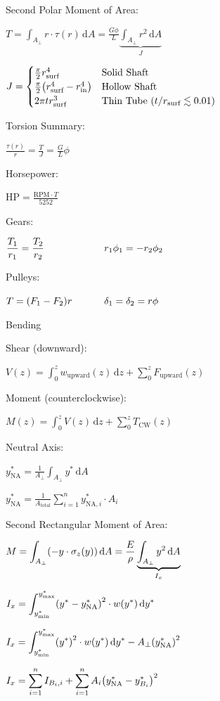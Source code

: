 \documentclass[10pt]{article}
\makeatletter
\newcommand{\ds}{\displaystyle}
\newcommand{\tab}{\hspace{.02\textwidth}}
\newcommand{\twoEqn}[4]{$\makebox[#3][l]{$#1$} \makebox[#4][l]{$#2$}$}
\renewcommand{\d}{\,\mathrm{d}}
\newcommand{\lrb}[1]{\left(#1\right)}
\let\originalleft\left
\let\originalright\right
\renewcommand{\left}{\mathopen{}\mathclose\bgroup\originalleft}
\renewcommand{\right}{\aftergroup\egroup\originalright}
\renewcommand{\section}{\@startsection{section}{1}{0ex}
                                {-2ex}
                                {0.7ex}
                                {\normalfont\large\bfseries}}
\newcommand{\surf}{\text{surf}}
\newcommand{\upward}{\text{upward}}
\newcommand{\CW}{\text{CW}}
\newcommand{\NA}{\text{NA}}
\renewcommand{\max}{\text{max}}
\renewcommand{\min}{\text{min}}
\newcommand{\total}{\text{total}}
\makeatother
\begin{document}
\begin{multicols*}{3}
Second Polar Moment of Area:

\tab $\ds T=\int_{A_\perp}r\cdot\tau(r)\d A=\frac{G\phi}{L}\underbrace{\int_{A_\perp}r^2\d A}_{J}$

\tab $\ds J=\begin{cases}
    \frac{\pi}{2}r_\surf^4 & \text{Solid Shaft} \\
    \frac{\pi}{2}\lrb{r_\surf^4-r_{\text{in}}^4} & \text{Hollow Shaft} \\
    2\pi tr_\surf^3 & \text{Thin Tube } (t/r_\surf\lesssim 0.01)
\end{cases}$

Torsion Summary:

\tab $\ds\frac{\tau(r)}{r}=\frac TJ=\frac GL\phi$

Horsepower:

\tab $\ds \mathrm{HP}=\frac{\mathrm{RPM}\cdot T}{5252}$

Gears:

\tab\twoEqn{\ds\frac{T_1}{r_1}=\frac{T_2}{r_2}}{r_1\phi_1=-r_2\phi_2}{10em}{10em}

Pulleys:

\tab\twoEqn{T=\lrb{F_1-F_2}r}{\delta_1=\delta_2=r\phi}{10em}{10em}

\newcolumn
\section{Bending}

Shear (downward):

\tab $\ds V(z)=\int_0^z w_\upward(z)\d z+\sum_0^z F_\upward(z)$

Moment (counterclockwise):

\tab $\ds M(z)=\int_0^z V(z)\d z+\sum_0^z T_\CW(z)$

Neutral Axis:

\tab $\ds y_\NA^*=\frac{1}{A_\perp}\int_{A_\perp}y^*\d A$

\tab $\ds y_\NA^*=\frac{1}{A_\total}\sum_{i=1}^n y_{\text{NA},i}^*\cdot A_i$

Second Rectangular Moment of Area:

\tab $\ds M=\int_{A_\perp}\lrb{-y\cdot\sigma_z(y)}\d A=\frac E\rho\underbrace{\int_{A_\perp}y^2\d A}_{I_x}$

\tab $\ds I_x=\int_{y_\min^*}^{y_\max^*}\lrb{y^*-y_\NA^*}^2\cdot w(y^*)\d y^*$

\tab $\ds I_x=\int_{y_\min^*}^{y_\max^*}\lrb{y^*}^2\cdot w(y^*)\d y^*-A_{\perp}\lrb{y_\NA^*}^2$

\tab $\ds I_x=\sum_{i=1}^n I_{B_i,i}+\sum_{i=1}^n A_i\lrb{y_\NA^*-y_{B_i}^*}^2$


\end{multicols*}
\end{document}

